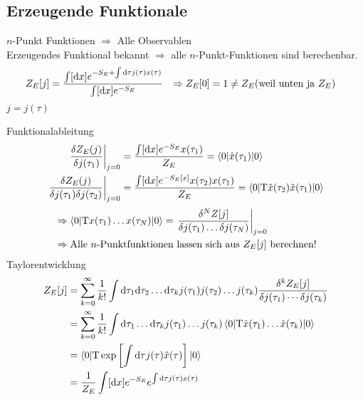 \subsection{Erzeugende Funktionale}
$n$-Punkt Funktionen $\Rightarrow$ Alle Observablen \\
Erzeugendes Funktional bekannt $\Rightarrow$ alle $n$-Punkt-Funktionen sind berechenbar.
	\begin{align*}
		Z_E [j] &= \frac{\int [\mathrm{d} x] e^{-S_E + \int \mathrm{d} \tau j(\tau) x(\tau)}}{\int[\mathrm{d} x] e^{-S_E}}
		&\Rightarrow Z_E[0] &= 1 \neq Z_E (\text{weil unten ja }Z_E) 
	\end{align*}
$j = j(\tau)$

Funktionalableitung
	\begin{align*}
		\left.\frac{\delta Z_E(j)}{\delta j(\tau_1)} \right|_{j = 0} 
		&= \frac{\int [\mathrm{d} x] e^{-S_E}x(\tau_1)}{Z_E} 
		= \braket{0 | \hat{x} (\tau_1) | 0} \\
		\left.\frac{\delta Z_E(j)}{\delta j (\tau_1) \delta j(\tau_2)} \right|_{j = 0}
		&= \frac{\int [\mathrm{d} x] e^{-S_E[x]} x(\tau_2) x(\tau_1)}{Z_E}
		= \braket{0 | \mathrm{T} \hat{x} (\tau_2) \hat{x}(\tau_1) | 0} 
	\end{align*}
	\begin{align*}
		&\Rightarrow \braket{0 | \mathrm{T} x(\tau_1) \ldots x(\tau_N) | 0} = 
		\left.\frac{\delta^N Z[j]}{\delta j(\tau_1) \ldots \delta j(\tau_N)} \right|_{j= 0} \\
		&\Rightarrow \text{Alle }n\text{-Punktfunktionen lassen sich aus }Z_E[j]\text{ berechnen!}
	\end{align*}
Taylorentwicklung 
	\begin{align*}
		Z_E[j] &= \sum_{k = 0}^{\infty} \frac{1}{k!} 
		\int \mathrm{d} \tau_1 \mathrm{d} \tau_2 \ldots \mathrm{d} \tau_k 
		j(\tau_1) j(\tau_2) \ldots j(\tau_k) 
		\frac{\delta^k Z_E [j]}{\delta j(\tau_1) \cdots \delta j(\tau_k)} \\
		&= \sum_{k = 0}^{\infty} \frac{1}{k!}
		\int \mathrm{d} \tau_1 \ldots \mathrm{d} \tau_k j(\tau_1) \ldots j(\tau_k) 
		\braket{0 | \mathrm{T} \hat{x} (\tau_1) \ldots \hat{x} (\tau_k) | 0} \\
		&= \braket{0 | \mathrm{T} \exp \left[\int \mathrm{d} \tau j (\tau) \hat{x}(\tau)\right] | 0} \\
		&= \frac{1}{Z_E} \int [\mathrm{d} x] e^{-S_E} e^{\int \mathrm{d} \tau j(\tau) x(\tau)}
	\end{align*}	
	
